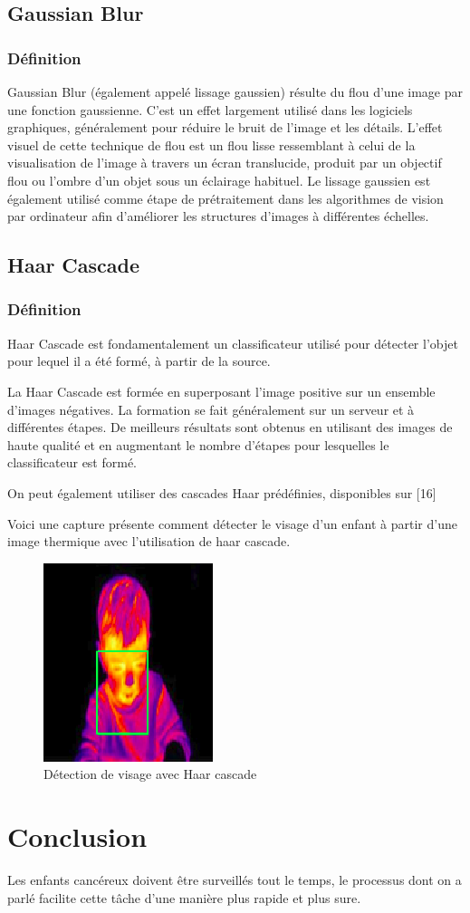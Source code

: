 \documentclass[12pt]{article}
\begin{document}
\subsection*{Gaussian Blur}
\subsubsection*{Définition}
Gaussian Blur (également appelé lissage gaussien) résulte du flou d'une image par une fonction gaussienne. C'est un effet largement utilisé dans les logiciels graphiques, généralement pour réduire le bruit de l'image et les détails. L’effet visuel de cette technique de flou est un flou lisse ressemblant à celui de la visualisation de l’image à travers un écran translucide, produit par un objectif flou ou l’ombre d’un objet sous un éclairage habituel. Le lissage gaussien est également utilisé comme étape de prétraitement dans les algorithmes de vision par ordinateur afin d'améliorer les structures d'images à différentes échelles.
\subsection*{Haar Cascade}
\subsubsection*{Définition}
Haar Cascade est fondamentalement un classificateur utilisé pour détecter l'objet pour lequel il a été formé, à partir de la source.

La Haar Cascade est formée en superposant l'image positive sur un ensemble d'images négatives. La formation se fait généralement sur un serveur et à différentes étapes. De meilleurs résultats sont obtenus en utilisant des images de haute qualité et en augmentant le nombre d'étapes pour lesquelles le classificateur est formé.

On peut également utiliser des cascades Haar prédéfinies, disponibles sur [16]

Voici une capture présente comment détecter le visage d'un enfant à partir d'une image thermique avec l'utilisation de haar cascade.
\newpage
\begin{figure}[h]
	\centering
	\includegraphics[scale=1]{img-Chapiter-3/enfant.png}
	\caption{Détection de visage avec Haar cascade}
\end{figure}
\section{Conclusion}
Les enfants cancéreux doivent être surveillés tout le temps, le processus dont on a parlé facilite cette tâche d’une manière plus rapide et plus sure. 
\end{document}

